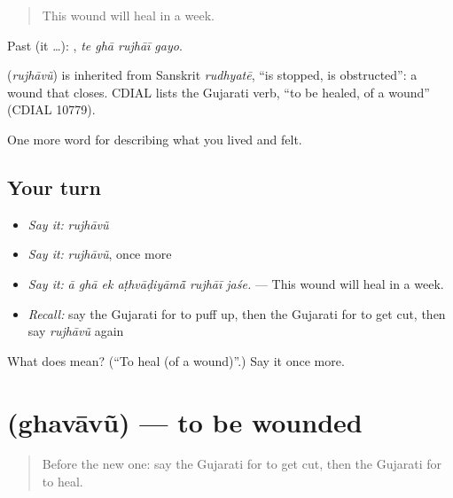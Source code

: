 \begin{quote}
This wound will heal in a week.
\end{quote}

Past (it …):    , \emph{te ghā rujhāī gayo}.

\begin{cousinweb}
\textbf{} (\emph{rujhāvũ}) is inherited from Sanskrit \emph{rudhyatē}, \textquotedblleft{}is stopped, is obstructed\textquotedblright{}: a wound that closes. CDIAL lists the Gujarati verb, \textquotedblleft{}to be healed, of a wound\textquotedblright{} (CDIAL 10779).
\end{cousinweb}

\begin{grammarlens}[title={What you've built}]
One more word for describing what you lived and felt.
\end{grammarlens}

\subsection*{Your turn}
\begin{itemize}
\raggedright
  \item \emph{Say it:} \emph{rujhāvũ}
  \item \emph{Say it:} \emph{rujhāvũ}, once more
  \item \emph{Say it:} \emph{ā ghā ek aṭhvāḍiyāmā̃ rujhāī jaśe.} — This wound will heal in a week.
  \item \emph{Recall:} say the Gujarati for to puff up, then the Gujarati for to get cut, then say \emph{rujhāvũ} again
\end{itemize}

\begin{tcolorbox}[breakable,colback=teal!4,colframe=teal!35!black,title={Before you move on}]
What does  mean? (\textquotedblleft{}To heal (of a wound)\textquotedblright{}.) Say it once more.
\end{tcolorbox}
\section[\texorpdfstring{\gu{ઘવાવું} (ghavāvũ)}{ઘવાવું (ghavāvũ)}]{ (ghavāvũ) — to be wounded}

\label{lesson:GU-C481-ghavavu}



\begin{quote}
Before the new one: say the Gujarati for to get cut, then the Gujarati for to heal.
\end{quote}

